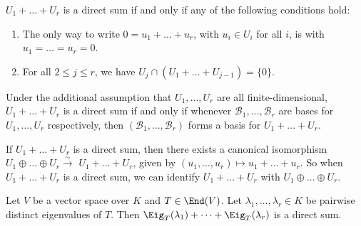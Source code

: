\begin{exercise}\label{ex:direct_sum_conditions}
  $U_1 + \dots + U_r$ is a direct sum if and only if any of the following conditions hold:
  \begin{enumerate}
    \item The only way to write $0 = u_1 + \dots + u_r$, with $u_i \in U_i$ for all $i$, is with $u_1 = \dots = u_r = 0$.
    \item For all $2 \le j \le r$, we have $U_j \cap (U_1 + \dots + U_{j-1}) = \{0\}$.
  \end{enumerate}
  Under the additional assumption that $U_1, \dots, U_r$ are all finite-dimensional, $U_1 + \dots + U_r$ is a direct sum if and only if whenever $\mathcal{B}_1, \dots, \mathcal{B}_r$ are bases for $U_1, \dots, U_r$ respectively, then $(\mathcal{B}_1, \dots, \mathcal{B}_r)$ forms a basis for $U_1 + \dots + U_r$.
\end{exercise}

\begin{exercise}\label{ex:canonical_iso_direct_sum}
  If $U_1 + \dots + U_r$ is a direct sum, then there exists a canonical isomorphism $U_1 \oplus \dots \oplus U_r \xrightarrow{\sim} $ $U_1 + \dots + U_r$, given by $(u_1, \dots, u_r) \mapsto u_1 + \dots + u_r$. So when $U_1 + \dots + U_r$ is a direct sum, we can identify $U_1 + \dots + U_r$ with $U_1 \oplus \dots \oplus U_r$.
\end{exercise}

\begin{proposition}\label{prop:direct_sum_eigenspaces}
  Let $V$ be a vector space over $K$ and $T \in \End(V)$. Let $\lambda_1, \dots, \lambda_r \in K$ be pairwise distinct eigenvalues of $T$. Then $\Eig_T(\lambda_1) + \dots + \Eig_T(\lambda_r)$ is a direct sum.
\end{proposition}

